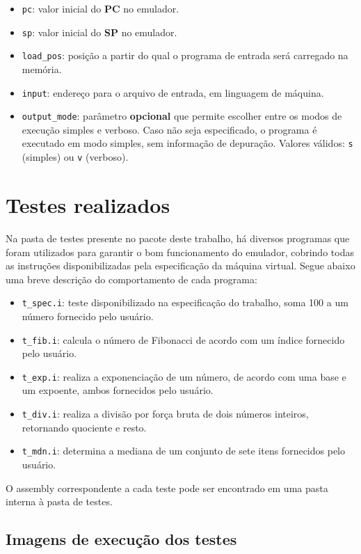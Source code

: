 \documentclass[10pt,a4paper]{article}
\numberwithin{equation}{section}
\begin{document}
\begin{itemize}
    \item \verb|pc|: valor inicial do \textbf{PC} no emulador.
    \item \verb|sp|: valor inicial do \textbf{SP} no emulador.
    \item \verb|load_pos|: posição a partir do qual o programa de entrada será carregado na memória.
    \item \verb|input|: endereço para o arquivo de entrada, em linguagem de máquina.
    \item \verb|output_mode|: parâmetro \textbf{opcional} que permite escolher entre os modos de execução simples e verboso. Caso não seja especificado, o programa é executado em modo simples, sem informação de depuração. Valores válidos: \verb|s| (simples) ou \verb|v| (verboso).
\end{itemize}

\section{Testes realizados}

Na pasta de testes presente no pacote deste trabalho, há diversos programas que foram utilizados para garantir o bom funcionamento do emulador, cobrindo todas as instruções disponibilizadas pela especificação da máquina virtual. Segue abaixo uma breve descrição do comportamento de cada programa:

\begin{itemize}
    \item \verb|t_spec.i|: teste disponibilizado na especificação do trabalho, soma 100 a um número fornecido pelo usuário.
    \item \verb|t_fib.i|: calcula o número de Fibonacci de acordo com um índice fornecido pelo usuário.
    \item \verb|t_exp.i|: realiza a exponenciação de um número, de acordo com uma base e um expoente, ambos fornecidos pelo usuário.
    \item \verb|t_div.i|: realiza a divisão por força bruta de dois números inteiros, retornando quociente e resto.
    \item \verb|t_mdn.i|: determina a mediana de um conjunto de sete itens fornecidos pelo usuário.
\end{itemize}

O assembly correspondente a cada teste pode ser encontrado em uma pasta interna à pasta de testes.

\subsection{Imagens de execução dos testes}
\end{document}
